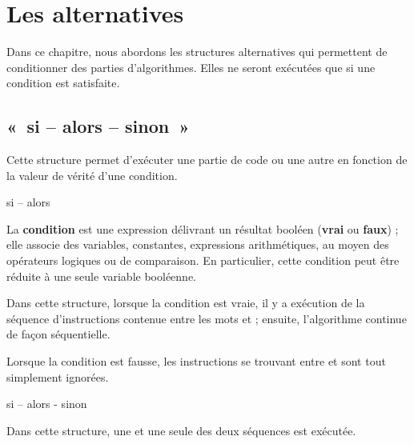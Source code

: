 \chapter{Les alternatives}

Dans ce chapitre, nous abordons les structures alternatives qui
permettent de conditionner des parties d'algorithmes.
Elles ne seront exécutées que si une condition est satisfaite.

\section{«~si – alors – sinon~»}

Cette structure permet d'exécuter une partie de code ou
une autre en fonction de la valeur de vérité d'une
condition.

\begin{Emphase}[definition]{si – alors}
\end{Emphase}

La \textbf{condition} est une expression délivrant un résultat booléen
(\textbf{vrai} ou \textbf{faux}) ; elle associe des variables,
constantes, expressions arithmétiques, au moyen des opérateurs logiques
ou de comparaison. En particulier, cette condition peut être réduite à
une seule variable booléenne.

Dans cette structure, lorsque la condition est vraie, il y a exécution
de la séquence d’instructions contenue entre les mots
 et  ; ensuite,
l’algorithme continue de façon séquentielle.

Lorsque la condition est fausse, les instructions se trouvant entre
 et  sont tout simplement
ignorées.


\begin{Emphase}[definition]{si – alors - sinon}
\end{Emphase}

Dans cette structure, une et une seule des deux séquences est exécutée.


